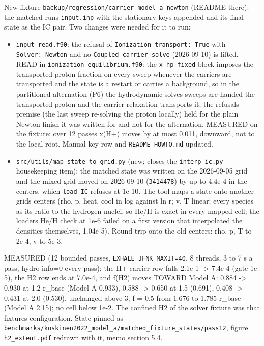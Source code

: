 \documentclass[english,a4paper]{my_memo}
\providecommand{\tightlist}{\setlength{\itemsep}{0pt}\setlength{\parskip}{0pt}}
\begin{document}
New fixture \texttt{backup/regression/carrier\_model\_a\_newton} (README there): the
matched run\textquotesingle s \texttt{input.inp} with the stationary keys appended and its final
state as the IC pair. Two changes were needed for it to run:

\begin{itemize}
\tightlist
\item
  \texttt{input\_read.f90}: the refusal of \texttt{Ionization\ transport:\ True} with
  \texttt{Solver:\ Newton} and no \texttt{Coupled\ carrier\ solve} (2026-09-10) is lifted.
  READ in \texttt{ionization\_equilibrium.f90}: the \texttt{x\_hp\_fixed} block imposes the
  transported proton fraction on every sweep whenever the carriers are
  transported and the state is a restart or carries a background, so in the
  partitioned alternation (P6) the hydrodynamic solve\textquotesingle s sweeps are handed
  the transported proton and the carrier relaxation transports it; the
  refusal\textquotesingle s premise (the last sweep re-solving the proton locally) held for
  the plain Newton finish it was written for and not for the alternation.
  MEASURED on the fixture: over 12 passes x(H+) moves by at most 0.011,
  downward, not to the local root. Manual key row and \texttt{README\_HOWTO.md}
  updated.
\item
  \texttt{src/utils/map\_state\_to\_grid.py} (new; closes the \texttt{interp\_ic.py}
  housekeeping item): the matched state was written on the 2026-09-05 grid
  and the mixed grid moved on 2026-09-10 (\texttt{3414478}) by up to 4.4e-4 in the
  centers, which \texttt{load\_IC} refuses at 1e-10. The tool maps a state onto
  another grid\textquotesingle s centers (rho, p, heat, cool in log against ln r; v, T
  linear; every species as its ratio to the hydrogen nuclei, so He/H is
  exact in every mapped cell; the loader\textquotesingle s He/H check at 1e-6 failed on a
  first version that interpolated the densities themselves, 1.04e-5).
  Round trip onto the old centers: rho, p, T to 2e-4, v to 5e-3.
\end{itemize}

MEASURED (12 bounded passes, \texttt{EXHALE\_JFNK\_MAXIT=40}, 8 threads, 3 to 7 s a
pass, hydro info=0 every pass): the H+ carrier row falls 2.1e-1 -\textgreater{} 7.4e-4
(gate 1e-5), the H2 row ends at 7.0e-4, and f(H2) moves TOWARD Model A:
0.884 -\textgreater{} 0.930 at 1.2 r\_base (Model A 0.933), 0.588 -\textgreater{} 0.650 at 1.5 (0.691),
0.408 -\textgreater{} 0.431 at 2.0 (0.530), unchanged above 3; f = 0.5 from 1.676 to
1.785 r\_base (Model A 2.15); no cell below 1e-2. The confined H2 of the
solver fixture was that fixture\textquotesingle s configuration. State pinned as
\texttt{benchmarks/koskinen2022\_model\_a/matched\_fixture\_states/pass12}, figure
\texttt{h2\_extent.pdf} redrawn with it, memo section 5.4.
\end{document}
